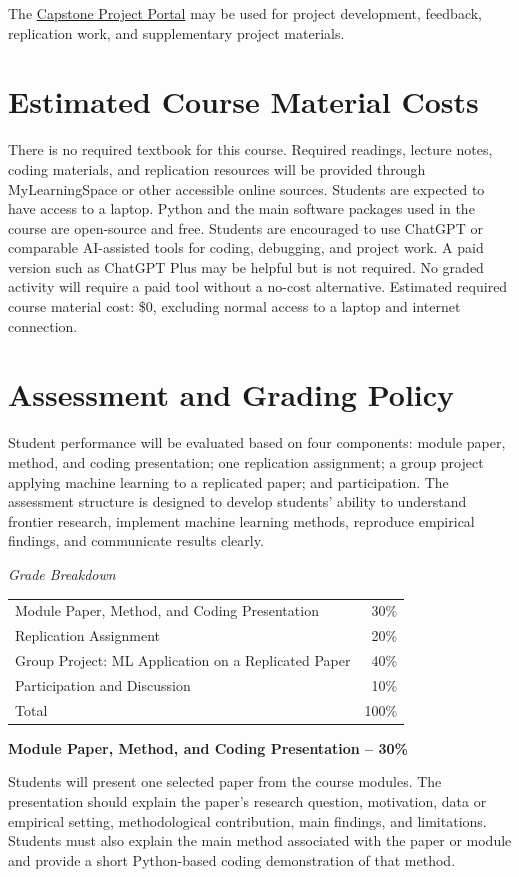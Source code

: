 \documentclass[11pt]{article}
\newcommand{\coloredsection}[1]{%
    \section*{\large\textcolor{sectioncolor}{#1}}%
}
\begin{document}
The \href{https://capstone-project-psi-one.vercel.app/}{Capstone Project Portal} may be used for project development, feedback, replication work, and supplementary project materials.

\coloredsection{Estimated Course Material Costs}

There is no required textbook for this course. Required readings, lecture notes, coding materials, and replication resources will be provided through MyLearningSpace or other accessible online sources. Students are expected to have access to a laptop. Python and the main software packages used in the course are open-source and free. Students are encouraged to use ChatGPT or comparable AI-assisted tools for coding, debugging, and project work. A paid version such as ChatGPT Plus may be helpful but is not required. No graded activity will require a paid tool without a no-cost alternative. Estimated required course material cost: \$0, excluding normal access to a laptop and internet connection.


\coloredsection{Assessment and Grading Policy}

Student performance will be evaluated based on four components: module paper, method, and coding presentation; one replication assignment; a group project applying machine learning to a replicated paper; and participation. The assessment structure is designed to develop students' ability to understand frontier research, implement machine learning methods, reproduce empirical findings, and communicate results clearly.

\vspace{4pt}
\noindent \textit{Grade Breakdown}

\vspace{2pt}
\begin{tabular}{@{}l r@{}}
Module Paper, Method, and Coding Presentation & 30\% \\
Replication Assignment & 20\% \\
Group Project: ML Application on a Replicated Paper & 40\% \\
Participation and Discussion & 10\% \\
\midrule
Total & 100\% \\
\end{tabular}

\vspace{8pt}

\noindent \textbf{Module Paper, Method, and Coding Presentation -- 30\%}

Students will present one selected paper from the course modules. The presentation should explain the paper's research question, motivation, data or empirical setting, methodological contribution, main findings, and limitations. Students must also explain the main method associated with the paper or module and provide a short Python-based coding demonstration of that method.
\end{document}
